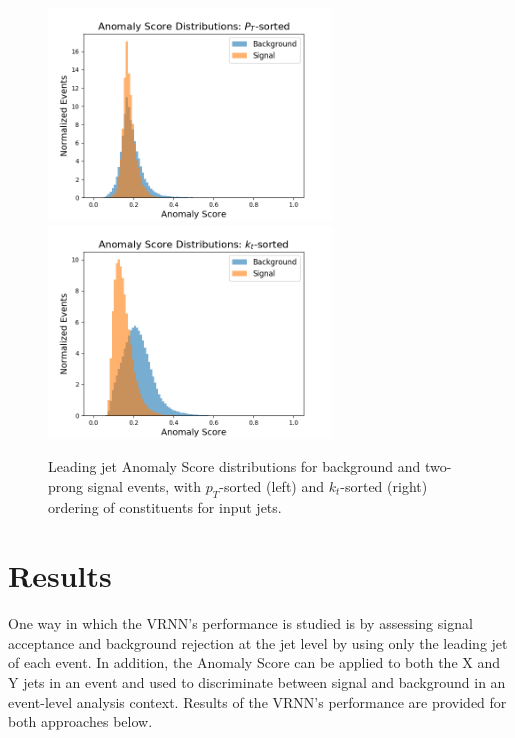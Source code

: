 \documentclass[11pt, a4paper]{article}
\begin{document}
\begin{figure}[H]
	\begin{center}
		\includegraphics[width=213pt]{imgs/Anom_Score_CompPt_SaveForPaper.png}
		\includegraphics[width=213pt]{imgs/bugfix/Anom_Score_CompKt_Rev_Lead_SaveForPaper.png}
	\end{center}
	\caption{Leading jet Anomaly Score distributions for background and two-prong signal events, with $p_T$-sorted (left) and $k_{t}$-sorted (right) ordering of constituents for input jets.}
	\label{fig:score_comp}
\end{figure}





\section{Results}

One way in which the VRNN's performance is studied is by assessing signal acceptance and background rejection at the jet level by using only the leading jet of each event. In addition, the Anomaly Score can be applied to both the X and Y jets in an event and used to discriminate between signal and background in an event-level analysis context. Results of the VRNN's performance are provided for both approaches below.
\end{document}
